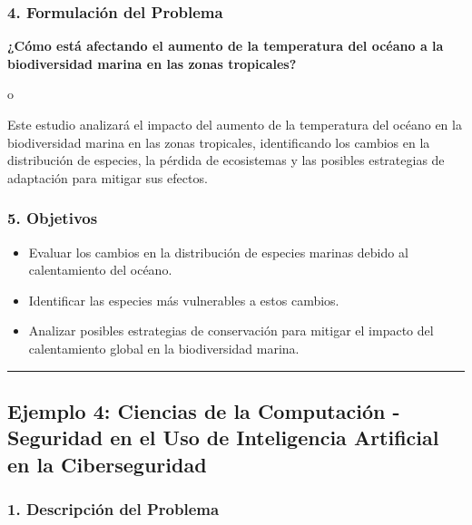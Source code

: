 \documentclass[
  letterpaper,
  DIV=11,
  numbers=noendperiod]{scrartcl}
\providecommand{\tightlist}{%
  \setlength{\itemsep}{0pt}\setlength{\parskip}{0pt}}
\begin{document}
\subsubsection{\texorpdfstring{\textbf{4. Formulación del
Problema}}{4. Formulación del Problema}}\label{formulaciuxf3n-del-problema-2}

\textbf{¿Cómo está afectando el aumento de la temperatura del océano a
la biodiversidad marina en las zonas tropicales?}

o

Este estudio analizará el impacto del aumento de la temperatura del
océano en la biodiversidad marina en las zonas tropicales, identificando
los cambios en la distribución de especies, la pérdida de ecosistemas y
las posibles estrategias de adaptación para mitigar sus efectos.

\subsubsection{\texorpdfstring{\textbf{5.
Objetivos}}{5. Objetivos}}\label{objetivos-2}

\begin{itemize}
\tightlist
\item
  Evaluar los cambios en la distribución de especies marinas debido al
  calentamiento del océano.\\
\item
  Identificar las especies más vulnerables a estos cambios.\\
\item
  Analizar posibles estrategias de conservación para mitigar el impacto
  del calentamiento global en la biodiversidad marina.
\end{itemize}

\begin{center}\rule{0.5\linewidth}{0.5pt}\end{center}

\subsection{\texorpdfstring{Ejemplo 4: \textbf{Ciencias de la
Computación - Seguridad en el Uso de Inteligencia Artificial en la
Ciberseguridad}}{Ejemplo 4: Ciencias de la Computación - Seguridad en el Uso de Inteligencia Artificial en la Ciberseguridad}}\label{ejemplo-4-ciencias-de-la-computaciuxf3n---seguridad-en-el-uso-de-inteligencia-artificial-en-la-ciberseguridad}

\subsubsection{\texorpdfstring{\textbf{1. Descripción del
Problema}}{1. Descripción del Problema}}\label{descripciuxf3n-del-problema-3}
\end{document}
